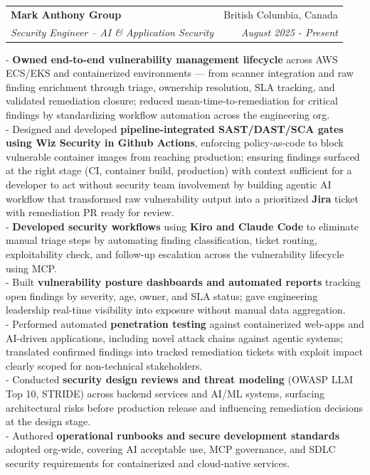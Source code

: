 \documentclass[letterpaper,11pt]{article}
\makeatletter
\newcommand{\resumeSubheading}[4]{
  \vspace{-1pt}\item
    \begin{tabular*}{0.97\textwidth}{l@{\extracolsep{\fill}}r}
      \textbf{#1} & #2 \\
      \textit{\small#3} & \textit{\small #4} \\
    \end{tabular*}\vspace{-5pt}
}
\newcommand{\resumeItemListStart}{\begin{itemize}}
\newcommand{\resumeItemListEnd}{\end{itemize}\vspace{-5pt}}
\makeatother
\begin{document}
  \resumeSubheading
      {Mark Anthony Group}{British Columbia, Canada}
      {Security Engineer -- AI \& Application Security}{August 2025 - Present}
      \resumeItemListStart
      \vspace{5pt}
          {- \textbf{Owned end-to-end vulnerability management lifecycle} across AWS ECS/EKS and containerized environments — from scanner integration and raw finding enrichment through triage, ownership resolution, SLA tracking, and validated remediation closure; reduced mean-time-to-remediation for critical findings by standardizing workflow automation across the engineering org. \\
           - Designed and developed \textbf{pipeline-integrated SAST/DAST/SCA gates using Wiz Security in Github Actions}, enforcing policy-as-code to block vulnerable container images from reaching production; ensuring findings surfaced at the right stage (CI, container build, production) with context sufficient for a developer to act without security team involvement by building agentic AI workflow that transformed raw vulnerability output into a prioritized \textbf{Jira} ticket with remediation PR ready for review. \\
           - \textbf{Developed security workflows} using \textbf{Kiro and Claude Code} to eliminate manual triage steps by automating finding classification, ticket routing, exploitability check, and follow-up escalation across the vulnerability lifecycle using MCP. \\
           - Built \textbf{vulnerability posture dashboards and automated reports} tracking open findings by severity, age, owner, and SLA status; gave engineering leadership real-time visibility into exposure without manual data aggregation. \\
           - Performed automated \textbf{penetration testing} against containerized web-apps and AI-driven applications, including novel attack chains against agentic systems; translated confirmed findings into tracked remediation tickets with exploit impact clearly scoped for non-technical stakeholders. \\
           - Conducted \textbf{security design reviews and threat modeling} (OWASP LLM Top 10, STRIDE) across backend services and AI/ML systems, surfacing architectural risks before production release and influencing remediation decisions at the design stage. \\
           - Authored \textbf{operational runbooks and secure development standards} adopted org-wide, covering AI acceptable use, MCP governance, and SDLC security requirements for containerized and cloud-native services.\newline }
    \resumeItemListEnd
\end{document}
